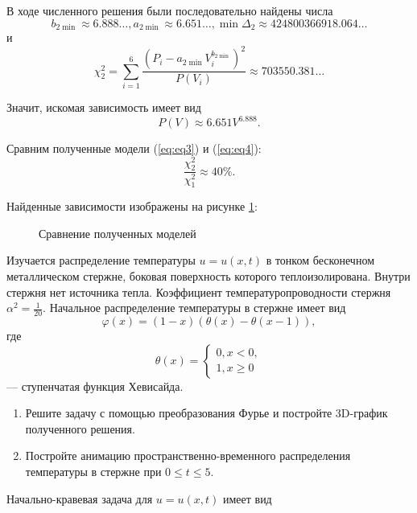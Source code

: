 В ходе численного решения были последовательно найдены числа
\[ b_{2 \min} \approx 6.888\ldots, a_{2 \min} \approx  6.651\ldots, \min \Delta _2 \approx 424800366918.064\ldots\]
и
\[ \chi _2^2 = \sum \limits _{i=1}^6 \dfrac{(P_i - a_{2 \min} V_i^{b_{2 \min}})^2}{P(V_i)} \approx 703550.381\ldots \]

Значит, искомая зависимость имеет вид
\begin{equation} \label{eq:eq4}
P(V) \approx 6.651 V^{6.888}.
\end{equation}

Сравним полученные модели (\ref{eq:eq3}) и (\ref{eq:eq4}):
\[
\dfrac{\chi _2^2}{\chi _1^2} \approx 40\%.
\]

Найденные зависимости изображены на рисунке \ref{fig:fig-2}:

\begin{figure}[h]
\vspace{5pt}
\centering

\caption{Сравнение полученных моделей}
\label{fig:fig-2}
\vspace{5pt}
\end{figure}

 Изучается распределение температуры $u=u(x, t)$ в тонком бесконечном металлическом стержне, боковая поверхность которого теплоизолирована. Внутри стержня нет источника тепла. Коэффициент температуропроводности стержня $\alpha^2 = \frac{1}{20}$. Начальное распределение температуры в стержне имеет вид
\[
\varphi (x)=(1-x)(\theta (x)- \theta (x-1)),
\]
где 
\[
\theta (x) =
\begin{cases}
0, x < 0,\\
1, x \ge 0
\end{cases}
\]
--- ступенчатая функция Хевисайда.\\

 \begin{enumerate}
\item Решите задачу с помощью преобразования Фурье и постройте 3D-график полученного решения.
\item Постройте анимацию пространственно-временного распределения температуры в стержне при $0 \le t \le 5$.
\end{enumerate}

Начально-кравевая задача для $u=u(x, t)$ имеет вид

